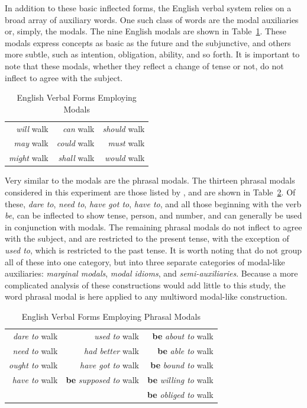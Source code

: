 \documentclass[main.tex]{subfiles}
\begin{document}
In addition to these basic inflected forms, the English verbal system relies on a broad array of auxiliary words. One such class of words are the modal auxiliaries or, simply, the modals. The nine English modals are shown in Table~\ref{table:modal-verbs}. These modals express concepts as basic as the future and the subjunctive, and others more subtle, such as intention, obligation, ability, and so forth. It is important to note that these modals, whether they reflect a change of tense or not, do not inflect to agree with the subject. 

\begin{table}[htbp]
\small
\centering
\caption{English Verbal Forms Employing Modals}
\begin{tabular}{ r r r }
\toprule
\textit{will} walk & \textit{can} walk & \textit{should} walk \\
\textit{may} walk & \textit{could} walk & \textit{must} walk \\
\textit{might} walk & \textit{shall} walk & \textit{would} walk\\
\bottomrule
\end{tabular}
\label{table:modal-verbs}
\end{table}

Very similar to the modals are the phrasal modals. The thirteen phrasal modals considered in this experiment are those listed by \citet[ch 3.]{quirk:1985}, and are shown in Table~\ref{table:quasimodal-verbs}. Of these, \textit{dare to}, \textit{need to}, \textit{have got to}, \textit{have to}, and all those beginning with the verb \textit{be}, can be inflected to show tense, person, and number, and can generally be used in conjunction with modals. The remaining phrasal modals do not inflect to agree with the subject, and are restricted to the present tense, with the exception of \textit{used to}, which is restricted to the past tense. It is worth noting that \citet{quirk:1985} do not group all of these into one category, but into three separate categories of modal-like auxiliaries: \textit{marginal modals}, \textit{modal idioms}, and \textit{semi-auxiliaries}. Because a more complicated analysis of these constructions would add little to this study, the word phrasal modal is here applied to any multiword modal-like construction.

\begin{table}[htbp]
\small
\centering
\caption{English Verbal Forms Employing Phrasal Modals}
\begin{tabular}{ r r r }
\toprule
\textit{dare to} walk & \textit{used to} walk & \textbf{be} \textit{about to} walk \\
\textit{need to} walk & \textit{had better} walk & \textbf{be} \textit{able to} walk \\
\textit{ought to} walk & \textit{have got to} walk & \textbf{be} \textit{bound to} walk \\
\textit{have to} walk & \textbf{be} \textit{supposed to} walk & \textbf{be} \textit{willing to} walk\\
&&\textbf{be} \textit{obliged to} walk\\
\bottomrule
\end{tabular}
\label{table:quasimodal-verbs}
\end{table}
\end{document}
